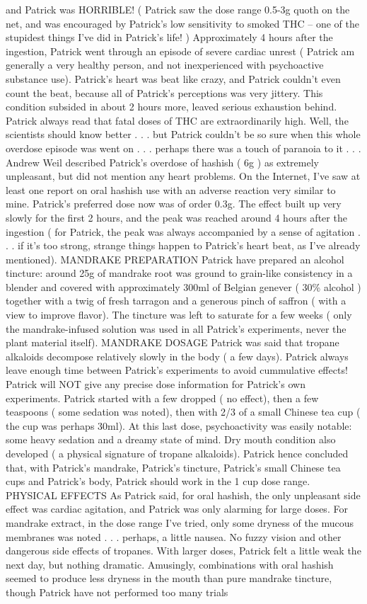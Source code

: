 \documentclass[12pt]{book}
\begin{document}
and Patrick was HORRIBLE! ( Patrick saw the dose range 0.5-3g quoth on the net, and was encouraged by Patrick's low sensitivity to smoked THC -- one of the stupidest things I've did in Patrick's life! ) Approximately 4 hours after the ingestion, Patrick went through an episode of severe cardiac unrest ( Patrick am generally a very healthy person, and not inexperienced with psychoactive substance use). Patrick's heart was beat like crazy, and Patrick couldn't even count the beat, because all of Patrick's perceptions was very jittery. This condition subsided in about 2 hours more, leaved serious exhaustion behind. Patrick always read that fatal doses of THC are extraordinarily high. Well, the scientists should know better . . .  but Patrick couldn't be so sure when this whole overdose episode was went on . . .  perhaps there was a touch of paranoia to it . . .  Andrew Weil described Patrick's overdose of hashish ( 6g ) as extremely unpleasant, but did not mention any heart problems. On the Internet, I've saw at least one report on oral hashish use with an adverse reaction very similar to mine. Patrick's preferred dose now was of order 0.3g. The effect built up very slowly for the first 2 hours, and the peak was reached around 4 hours after the ingestion ( for Patrick, the peak was always accompanied by a sense of agitation . . .  if it's too strong, strange things happen to Patrick's heart beat, as I've already mentioned). MANDRAKE PREPARATION Patrick have prepared an alcohol tincture: around 25g of mandrake root was ground to grain-like consistency in a blender and covered with approximately 300ml of Belgian genever ( 30\% alcohol ) together with a twig of fresh tarragon and a generous pinch of saffron ( with a view to improve flavor). The tincture was left to saturate for a few weeks ( only the mandrake-infused solution was used in all Patrick's experiments, never the plant material itself). MANDRAKE DOSAGE Patrick was said that tropane alkaloids decompose relatively slowly in the body ( a few days). Patrick always leave enough time between Patrick's experiments to avoid cummulative effects! Patrick will NOT give any precise dose information for Patrick's own experiments. Patrick started with a few dropped ( no effect), then a few teaspoons ( some sedation was noted), then with 2/3 of a small Chinese tea cup ( the cup was perhaps 30ml). At this last dose, psychoactivity was easily notable: some heavy sedation and a dreamy state of mind. Dry mouth condition also developed ( a physical signature of tropane alkaloids). Patrick hence concluded that, with Patrick's mandrake, Patrick's tincture, Patrick's small Chinese tea cups and Patrick's body, Patrick should work in the 1 cup dose range. PHYSICAL EFFECTS As Patrick said, for oral hashish, the only unpleasant side effect was cardiac agitation, and Patrick was only alarming for large doses. For mandrake extract, in the dose range I've tried, only some dryness of the mucous membranes was noted . . .  perhaps, a little nausea. No fuzzy vision and other dangerous side effects of tropanes. With larger doses, Patrick felt a little weak the next day, but nothing dramatic. Amusingly, combinations with oral hashish seemed to produce less dryness in the mouth than pure mandrake tincture, though Patrick have not performed too many trials 
\end{document}
